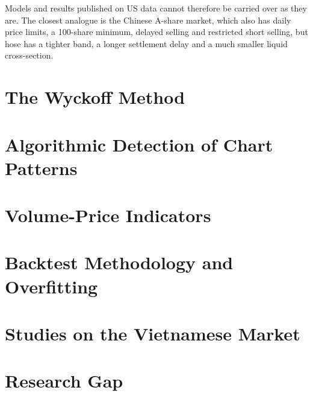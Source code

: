 Models and results published on US data cannot therefore be carried over as they are. The
closest analogue is the Chinese A-share market, which also has daily price limits, a 100-share
minimum, delayed selling and restricted short selling, but \gls{hose} has a tighter band, a
longer settlement delay and a much smaller liquid cross-section.

\section{The Wyckoff Method}

\section{Algorithmic Detection of Chart Patterns}

\section{Volume-Price Indicators}

\section{Backtest Methodology and Overfitting}

\section{Studies on the Vietnamese Market}

\section{Research Gap}
